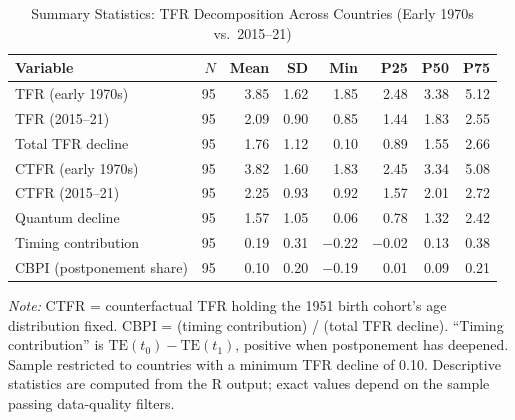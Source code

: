 \documentclass[12pt]{article}
\begin{document}
\begin{table}[H]
\centering
\caption{Summary Statistics: TFR Decomposition Across Countries
         (Early 1970s vs.\ 2015--21)}
\label{tab:summary}
\begin{threeparttable}
\begin{tabular}{lrrrrrrr}
\toprule
Variable & $N$ & Mean & SD & Min & P25 & P50 & P75 \\
\midrule
TFR (early 1970s)       & 95 & 3.85 & 1.62 & 1.85 & 2.48 & 3.38 & 5.12 \\
TFR (2015--21)           & 95 & 2.09 & 0.90 & 0.85 & 1.44 & 1.83 & 2.55 \\
Total TFR decline        & 95 & 1.76 & 1.12 & 0.10 & 0.89 & 1.55 & 2.66 \\
CTFR (early 1970s)      & 95 & 3.82 & 1.60 & 1.83 & 2.45 & 3.34 & 5.08 \\
CTFR (2015--21)          & 95 & 2.25 & 0.93 & 0.92 & 1.57 & 2.01 & 2.72 \\
Quantum decline          & 95 & 1.57 & 1.05 & 0.06 & 0.78 & 1.32 & 2.42 \\
Timing contribution      & 95 & 0.19 & 0.31 & $-$0.22 & $-$0.02 & 0.13 & 0.38 \\
CBPI (postponement share)& 95 & 0.10 & 0.20 & $-$0.19 & 0.01 & 0.09 & 0.21 \\
\bottomrule
\end{tabular}
\begin{tablenotes}
\footnotesize
\emph{Note:} CTFR = counterfactual TFR holding the 1951 birth cohort's
age distribution fixed. CBPI = (timing contribution) / (total TFR decline).
``Timing contribution'' is $\mathrm{TE}(t_0) - \mathrm{TE}(t_1)$, positive
when postponement has deepened. Sample restricted to countries with a minimum
TFR decline of 0.10. Descriptive statistics are computed from the R output;
exact values depend on the sample passing data-quality filters.
\end{tablenotes}
\end{threeparttable}
\end{table}
\end{document}
